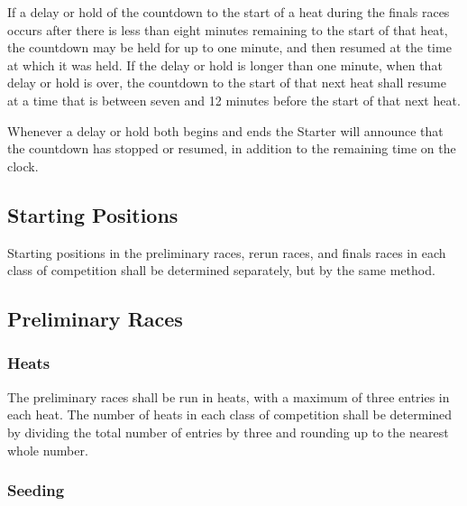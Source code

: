 	If a delay or hold of the countdown to the start of a heat during the finals
	races occurs after there is less than eight minutes remaining to the start of
	that heat, the countdown may be held for up to one minute, and then resumed at
	the time at which it was held. If the delay or hold is longer than one minute,
	when that delay or hold is over, the countdown to the start of that next heat
	shall resume at a time that is between seven and 12 minutes before the start of
	that next heat.

	Whenever a delay or hold both begins and ends the Starter will announce that the 
	countdown has stopped or resumed, in addition to the remaining time on the clock.

\subsection{Starting Positions}

	Starting positions in the preliminary races, rerun races, and finals races in
	each class of competition shall be determined separately, but by the same
	method.

\subsection{Preliminary Races}

\subsubsection{Heats}

	The preliminary races shall be run in heats, with a maximum of three entries in
	each heat. The number of heats in each class of competition shall be determined
	by dividing the total number of entries by three and rounding up to the nearest
	whole number.

\subsubsection{Seeding}

